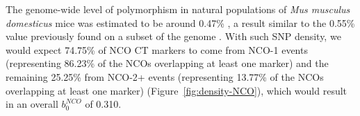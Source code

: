 The genome-wide level of polymorphism in natural populations of \textit{Mus musculus domesticus} mice was estimated to be around 0.47\% \citep{davies2015factors}, a result similar to the 0.55\% value previously found on a subset of the genome \citep{frazer2007sequencebased}.
With such SNP density, we would expect 74.75\% of NCO CT markers to come from NCO-1 events (representing 86.23\% of the NCOs overlapping at least one marker) and the remaining 25.25\% from NCO-2+ events (representing 13.77\% of the NCOs overlapping at least one marker) (Figure~\ref{fig:density-NCO}), which would result in an overall $b_0^{NCO}$ of 0.310.


